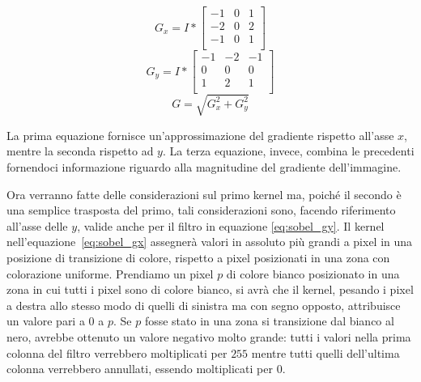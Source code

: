 \begin{equation} \label{eq:sobel_gx}
  G_x = 
  I
  *
  \begin{bmatrix}
    -1&0&1\\
    -2&0&2\\
    -1&0&1\\
  \end{bmatrix}
\end{equation}
\begin{equation} \label{eq:sobel_gy}
  G_y = 
  I
  *
  \begin{bmatrix}
    -1&-2&-1\\
    0&0&0\\
    1&2&1\\
  \end{bmatrix}
\end{equation}
\begin{equation} \label{eq:sobel_g}
  G = \sqrt{G_x^2 + G_y^2}
\end{equation}

La prima equazione fornisce un'approssimazione del gradiente rispetto all'asse $x$, mentre la seconda rispetto ad $y$.
La terza equazione, invece, combina le precedenti fornendoci informazione riguardo alla magnitudine del gradiente dell'immagine.

Ora verranno fatte delle considerazioni sul primo kernel ma, poiché il secondo è una semplice trasposta del primo, tali considerazioni sono, facendo riferimento all'asse delle $y$, valide anche per il filtro in equazione \ref{eq:sobel_gy}.
Il kernel nell'equazione~\ref{eq:sobel_gx} assegnerà valori in assoluto più grandi a pixel in una posizione di transizione di colore, rispetto a pixel posizionati in una zona con colorazione uniforme.
Prendiamo un pixel $p$ di colore bianco posizionato in una zona in cui tutti i pixel sono di colore bianco, si avrà che il kernel, pesando i pixel a destra allo stesso modo di quelli di sinistra ma con segno opposto, attribuisce un valore pari a $0$ a $p$.
Se $p$ fosse stato in una zona si transizione dal bianco al nero, avrebbe ottenuto un valore negativo molto grande:
tutti i valori nella prima colonna del filtro verrebbero moltiplicati per $255$ mentre tutti quelli dell'ultima colonna verrebbero annullati, essendo moltiplicati per $0$.


